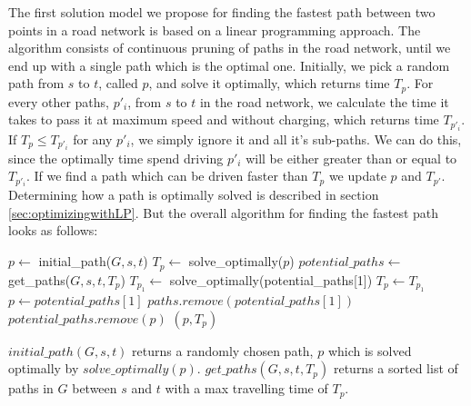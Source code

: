 The first solution model we propose for finding the fastest path between two points in a road network is based on a linear programming approach. 
The algorithm consists of continuous pruning of paths in the road network, until we end up with a single path which is the optimal one. Initially, we pick a random path from $s$ to $t$, called $p$, and solve it optimally, which returns time $T_p$. For every other paths, $p'_i$, from $s$ to $t$ in the road network, we calculate the time it takes to pass it at maximum speed and without charging, which returns time $T_{p'_{i}}$. If $T_p \leq T_{p'_{i}}$ for any $p'_{i}$, we simply ignore it and all it's sub-paths. We can do this, since the optimally time spend driving $p'_i$ will be either greater than or equal to $T_{p'_{i}}$. If we find a path which can be driven faster than $T_p$ we update $p$ and $T_{p'}$. Determining how a path is optimally solved is described in section \ref{sec:optimizingwithLP}. But the overall algorithm for finding the fastest path looks as follows:\\

\begin{algorithmic}
    \State $p \gets$ initial\_path($G,s,t$) 
    \State $T_p \gets$ solve\_optimally($p$)
    \State $potential\_paths \gets$ get\_paths($G,s,t,T_p$)
    \Repeat 
    	\State $T_{p_1} \gets$ solve\_optimally(potential\_paths[1])
    		\State $T_p \gets T_{p_1}$
    		\State $p \gets potential\_paths[1]$ 
    	\EndIf  
    	\State $paths.remove(potential\_paths[1])$
    			\State $potential\_paths.remove(p)$
    		\EndIf
    	\EndFor
    \State \Return $(p, T_p)$
\EndFunction
\end{algorithmic}

$initial\_path(G,s,t)$ returns a randomly chosen path, $p$ which is solved optimally by $solve\_optimally(p)$. $get\_paths(G,s,t,T_p)$ returns a sorted list of paths in $G$ between $s$ and $t$ with a max travelling time of $T_p$.

%
%
%
%
%



